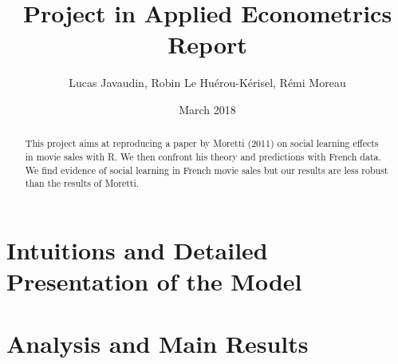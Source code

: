\documentclass{article}
\title{Project in Applied Econometrics\\ Report}
\author{Lucas Javaudin, Robin Le Huérou-Kérisel, Rémi Moreau}
\date{March 2018}
\begin{document}
\maketitle

%
%
%
%
%
\begin{abstract}
	This project aims at reproducing a paper by Moretti (2011) on social learning effects in movie sales with R. We then confront his theory and predictions with French data. We find evidence of social learning in French movie sales but our results are less robust than the results of Moretti.
\end{abstract}
\tableofcontents
\pagebreak
\section{Intuitions and Detailed Presentation of the Model}


\pagebreak
\section{Analysis and Main Results}





\pagebreak
\end{document}
